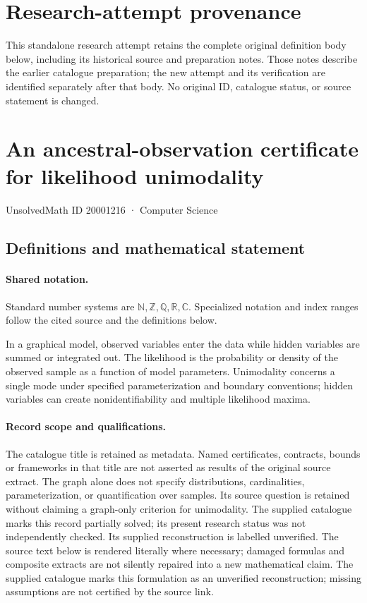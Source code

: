 \documentclass[11pt]{article}
\begin{document}
\section*{Research-attempt provenance}
This standalone research attempt retains the complete original definition body below,
including its historical source and preparation notes. Those notes describe the
earlier catalogue preparation; the new attempt and its verification are identified
separately after that body. No original ID, catalogue status, or source statement is changed.

\section{An ancestral-observation certificate for likelihood unimodality}\label{20001216}
{\small UnsolvedMath ID 20001216 · Computer Science}
\subsection{Definitions and mathematical statement}

\paragraph{Shared notation.}Standard number systems are $\mathbb N,\mathbb Z,\mathbb Q,\mathbb R,\mathbb C$. Specialized notation and index ranges follow the cited source and the definitions below.


In a graphical model, observed variables enter the data while hidden variables are summed or integrated out. The likelihood is the probability or density of the observed sample as a function of model parameters. Unimodality concerns a single mode under specified parameterization and boundary conventions; hidden variables can create nonidentifiability and multiple likelihood maxima.
\paragraph{Record scope and qualifications.}
The catalogue title is retained as metadata. Named certificates, contracts, bounds or frameworks in that title are not asserted as results of the original source extract.
The graph alone does not specify distributions, cardinalities, parameterization, or quantification over samples. Its source question is retained without claiming a graph-only criterion for unimodality. The supplied catalogue marks this record partially solved; its present research status was not independently checked. Its supplied reconstruction is labelled unverified.
The source text below is rendered literally where necessary; damaged formulas and composite extracts are not silently repaired into a new mathematical claim.
The supplied catalogue marks this formulation as an unverified reconstruction; missing assumptions are not certified by the source link.
\end{document}
